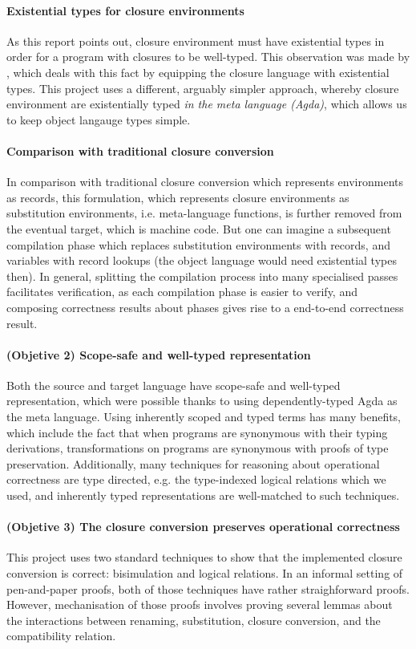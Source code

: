 \documentclass[bsc,frontabs,oneside,singlespacing,parskip,deptreport]{infthesis}
\theoremstyle{definition}
\theoremstyle{lemma}
\begin{document}
\paragraph{Existential types for closure environments}
As this report points out, closure environment must have existential
types in order for a program with closures to be well-typed. This
observation was made by \cite{DBLP:conf/popl/MinamideMH96}, which
deals with this fact by equipping the closure language with
existential types. This project uses a different, arguably simpler
approach, whereby closure environment are existentially typed
\textit{in the meta language (Agda)}, which allows us to keep object
langauge types simple.

\paragraph{Comparison with traditional closure conversion}
In comparison with traditional closure conversion which represents
environments as records, this formulation, which represents closure
environments as substitution environments, i.e. meta-language
functions, is further removed from the eventual target, which is
machine code. But one can imagine a subsequent compilation phase which
replaces substitution environments with records, and variables with
record lookups (the object language would need existential types
then). In general, splitting the compilation process into many
specialised passes facilitates verification, as each compilation phase
is easier to verify, and composing correctness results about phases
gives rise to a end-to-end correctness result.

\paragraph{(Objetive 2) Scope-safe and well-typed representation}
Both the source and target language have scope-safe and well-typed
representation, which were possible thanks to using dependently-typed
Agda as the meta language. Using inherently scoped and typed terms has
many benefits, which include the fact that when programs are synonymous
with their typing derivations, transformations on programs are
synonymous with proofs of type preservation. Additionally, many
techniques for reasoning about operational correctness are type
directed, e.g. the type-indexed logical relations which we used, and
inherently typed representations are well-matched to such techniques.

\paragraph{(Objetive 3) The closure conversion preserves operational correctness}
This project uses two standard techniques to show that the implemented
closure conversion is correct: bisimulation and logical relations. In
an informal setting of pen-and-paper proofs, both of those techniques
have rather straighforward proofs. However, mechanisation of those
proofs involves proving several lemmas about the interactions between
renaming, substitution, closure conversion, and the compatibility
relation.
\end{document}
